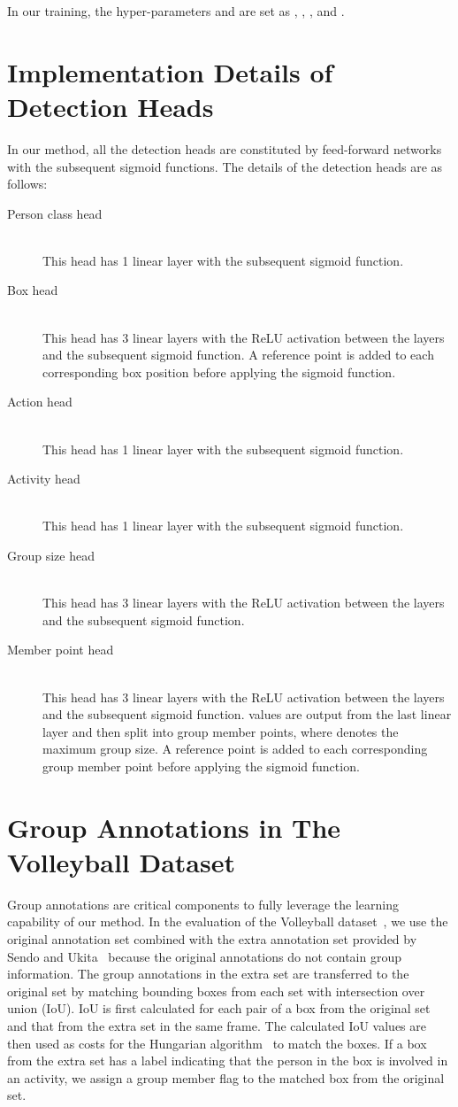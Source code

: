 \documentclass[runningheads]{llncs}
\begin{document}
In our training, the hyper-parameters  and  are set as , , , and .

\section{Implementation Details of Detection Heads}

In our method, all the detection heads are constituted by feed-forward networks with the subsequent sigmoid functions. The details of the detection heads are as follows:
\begin{description}
\item[Person class head]\mbox{}\\
This head has 1 linear layer with the subsequent sigmoid function.
\item[Box head]\mbox{}\\
This head has 3 linear layers with the ReLU activation between the layers and the subsequent sigmoid function. A reference point is added to each corresponding box position before applying the sigmoid function.
\item[Action head]\mbox{}\\
This head has 1 linear layer with the subsequent sigmoid function.
\item[Activity head]\mbox{}\\
This head has 1 linear layer with the subsequent sigmoid function.
\item[Group size head]\mbox{}\\
This head has 3 linear layers with the ReLU activation between the layers and the subsequent sigmoid function.
\item[Member point head]\mbox{}\\
This head has 3 linear layers with the ReLU activation between the layers and the subsequent sigmoid function.  values are output from the last linear layer and then split into  group member points, where  denotes the maximum group size. A reference point is added to each corresponding group member point before applying the sigmoid function.
\end{description}

\section{Group Annotations in The Volleyball Dataset}
Group annotations are critical components to fully leverage the learning capability of our method. In the evaluation of the Volleyball dataset~\cite{ibrahim_cvpr2016}, we use the original annotation set combined with the extra annotation set provided by Sendo and Ukita~\cite{sendo_mva2019} because the original annotations do not contain group information. The group annotations in the extra set are transferred to the original set by matching bounding boxes from each set with intersection over union (IoU). IoU is first calculated for each pair of a box from the original set and that from the extra set in the same frame. The calculated IoU values are then used as costs for the Hungarian algorithm~\cite{kuhn_naval1955} to match the boxes. If a box from the extra set has a label indicating that the person in the box is involved in an activity, we assign a group member flag to the matched box from the original set.
\end{document}
